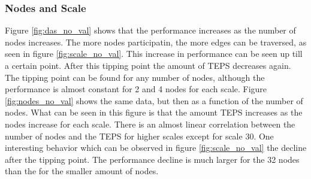 \subsubsection{Nodes and Scale}
\label{res:nodes_scale}
Figure \ref{fig:das_no_val} shows that the performance increases as the number of nodes increases. The more nodes participatin, the more edges can be traversed, as seen in figure \ref{fig:scale_no_val}. This increase in performance can be seen up till a certain point. After this tipping point the amount of TEPS decreases again. The tipping point can be found for any number of nodes, although the performance is almost constant for 2 and 4 nodes for each scale.
Figure \ref{fig:nodes_no_val} shows the same data, but then as a function of the number of nodes. What can be seen in this figure is that the amount TEPS increases as the nodes increase for each scale. There is an almost linear correlation between the number of nodes and the TEPS for higher scales except for scale 30. One interesting behavior which can be observed in figure \ref{fig:scale_no_val} the decline after the tipping point. The performance decline is much larger for the 32 nodes than the for the smaller amount of nodes.

